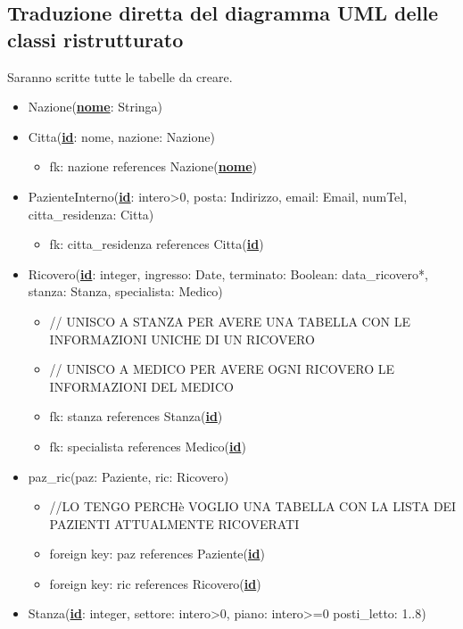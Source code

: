 \documentclass[12pt, letterpaper]{article}
\begin{document}
\subsection{Traduzione diretta del diagramma UML delle classi ristrutturato}
Saranno scritte tutte le tabelle da creare.
\begin{itemize}
    \item Nazione(\underline{\textbf{nome}}: Stringa)
    \item Citta(\underline{\textbf{id}}: nome, nazione: Nazione)
    \begin{itemize}
        \item fk: nazione references Nazione(\underline{\textbf{nome}})
    \end{itemize}
    \item PazienteInterno(\underline{\textbf{id}}: intero>0, posta: Indirizzo, email: Email, numTel, citta\_residenza: Citta)
    \begin{itemize}
        \item fk: citta\_residenza references Citta(\underline{\textbf{id}})
    \end{itemize}
    \item Ricovero(\underline{\textbf{id}}: integer, ingresso: Date, terminato: Boolean: data\_ricovero*, stanza: Stanza, specialista: Medico)
    \begin{itemize}
        \item // UNISCO A STANZA PER AVERE UNA TABELLA CON LE INFORMAZIONI UNICHE DI UN RICOVERO
        \item // UNISCO A MEDICO PER AVERE OGNI RICOVERO LE INFORMAZIONI DEL MEDICO
        \item fk: stanza references Stanza(\underline{\textbf{id}})
        \item fk: specialista references Medico(\underline{\textbf{id}})
    \end{itemize}
    \item paz\_ric(paz: Paziente, ric: Ricovero)
    \begin{itemize}
        \item //LO TENGO PERCHè VOGLIO UNA TABELLA CON LA LISTA DEI PAZIENTI ATTUALMENTE RICOVERATI
        \item foreign key: paz references Paziente(\underline{\textbf{id}})
        \item foreign key: ric references Ricovero(\underline{\textbf{id}})
    \end{itemize}
    \item Stanza(\underline{\textbf{id}}: integer, settore: intero>0, piano: intero>=0 posti\_letto: 1..8)

\end{itemize}
\end{document}
